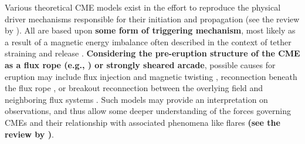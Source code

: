 \documentclass[namedreferences]{solarphysics}
\begin{document}
\begin{article}
Various theoretical CME models exist in the effort to reproduce the physical driver mechanisms responsible for their initiation and propagation (see the review by ). All are based upon {\bf some form of triggering mechanism}, most likely as a result of a magnetic energy imbalance often described in the context of tether straining and release \cite{2001AGUGM.125..143K}. {\bf Considering the pre-eruption structure of the CME as a flux rope (e.g., ) or strongly sheared arcade}, possible causes for eruption may include flux injection and magnetic twisting \cite{2006PhRvL..96y5002K,2001ApJ...562.1045K}, reconnection beneath the flux rope \cite{2007ApJ...658L.123L,2003ApJ...595.1231A,1995ApJ...446..377F,1980IAUS...91..207M}, or breakout reconnection between the overlying field and neighboring flux systems \cite{2008ApJ...683.1192L,2007ApJ...671L..77V,1999ApJ...510..485A}. Such models may provide an interpretation on observations, and thus allow some deeper understanding of the forces governing CMEs and their relationship with associated phenomena like flares {\bf (see the review by )}.




\end{article}
\end{document}
